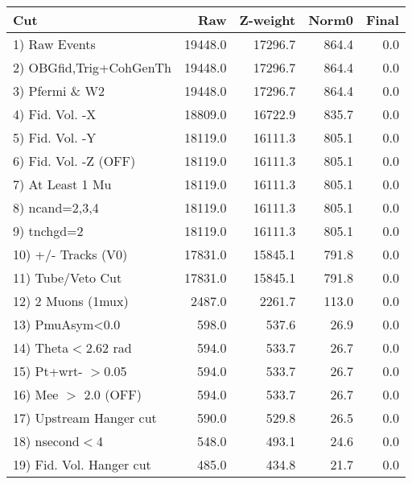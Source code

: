  \begin{table}[h!]\centering
 \begin{tabular}{||l||r|r|r|r||}
 \hline
 \hline
 Cut & Raw & Z-weight & Norm0 & Final \\
 \hline
  1) Raw Events           &     19448.0 &     17296.7 &       864.4 &         0.0 \\
  2) OBGfid,Trig+CohGenTh &     19448.0 &     17296.7 &       864.4 &         0.0 \\
  3) Pfermi \& W2         &     19448.0 &     17296.7 &       864.4 &         0.0 \\
  4) Fid. Vol. -X         &     18809.0 &     16722.9 &       835.7 &         0.0 \\
  5) Fid. Vol. -Y         &     18119.0 &     16111.3 &       805.1 &         0.0 \\
  6) Fid. Vol. -Z (OFF)   &     18119.0 &     16111.3 &       805.1 &         0.0 \\
  7) At Least 1 Mu        &     18119.0 &     16111.3 &       805.1 &         0.0 \\
  8) ncand=2,3,4          &     18119.0 &     16111.3 &       805.1 &         0.0 \\
  9) tnchgd=2             &     18119.0 &     16111.3 &       805.1 &         0.0 \\
 10) +/- Tracks (V0)      &     17831.0 &     15845.1 &       791.8 &         0.0 \\
 11) Tube/Veto Cut        &     17831.0 &     15845.1 &       791.8 &         0.0 \\
 12) 2 Muons (1mux)       &      2487.0 &      2261.7 &       113.0 &         0.0 \\
 13) PmuAsym<0.0          &       598.0 &       537.6 &        26.9 &         0.0 \\
 14) Theta$<$2.62 rad     &       594.0 &       533.7 &        26.7 &         0.0 \\
 15) Pt+wrt- $>$0.05      &       594.0 &       533.7 &        26.7 &         0.0 \\
 16) Mee $>$ 2.0  (OFF)   &       594.0 &       533.7 &        26.7 &         0.0 \\
 17) Upstream Hanger cut  &       590.0 &       529.8 &        26.5 &         0.0 \\
 18) nsecond$<$4          &       548.0 &       493.1 &        24.6 &         0.0 \\
 19) Fid. Vol. Hanger cut &       485.0 &       434.8 &        21.7 &         0.0 \\

\end{tabular}
\end{table}
